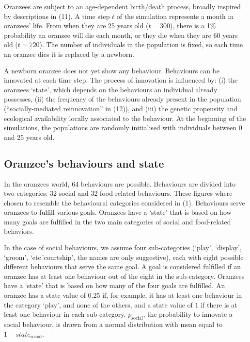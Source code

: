 \documentclass[9pt,twocolumn,twoside,]{pnas-new}
\begin{document}
Oranzees are subject to an age-dependent birth/death process, broadly
inspired by descriptions in (11). A time step \(t\) of the simulation
represents a month in oranzees' life. From when they are 25 years old
(\(t=300\)), there is a 1\% probability an oranzee will die each month,
or they die when they are 60 years old (\(t=720\)). The number of
individuals in the population is fixed, so each time an oranzee dies it
is replaced by a newborn.

A newborn oranzee does not yet show any behaviour. Behaviours can be
innovated at each time step. The process of innovation is influenced by:
(i) the oranzees `state', which depends on the behaviours an individual
already possesses, (ii) the frequency of the behaviours already present
in the population (``socially-mediated reinnovation'' in (12)), and
(iii) the genetic propensity and ecological availability locally
associated to the behaviour. At the beginning of the simulations, the
populations are randomly initialised with individuals between 0 and 25
years old.

\subsection*{Oranzee's behaviours and state}\label{format}

In the oranzees world, 64 behaviours are possible. Behaviours are
divided into two categories: 32 social and 32 food-related behaviours.
These figures where chosen to resemble the behavioural categories
considered in (1). Behaviours serve oranzees to fulfill various goals.
Oranzees have a `state' that is based on how many goals are fulfilled in
the two main categories of social and food-related behaviors.

In the case of social behaviours, we assume four sub-categories (`play',
`display', `groom', `etc.'courtship', the names are only suggestive),
each with eight possible different behaviours that serve the same goal.
A goal is considered fulfilled if an oranzee has at least one behaviour
out of the eight in the sub-category. Oranzees have a `state' that is
based on how many of the four goals are fulfilled. An oranzee has a
state value of \(0.25\) if, for example, it has at least one behaviour
in the category `play', and none of the others, and a state value of
\(1\) if there is at least one behaviour in each sub-category.
\(p_\text{social}\), the probability to innovate a social behaviour, is
drawn from a normal distribution with mean equal to
\(1-state_\text{social}\).
\end{document}

